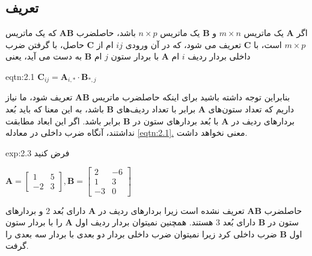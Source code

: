 \subsection{\textbf{تعریف}}
\label{subsec:2.2.1}
{
    \Large
    \begin{spacing}{1.5}
        اگر $\textbf{A}$ یک ماتریس $m\times n$ و $\textbf{B}$ یک ماتریس $n\times p$ باشد،
        حاصلضرب $\textbf{AB}$ که یک ماتریس $m\times p$ است، با $\textbf{C}$ تعریف می شود،
        که در آن ورودی $ij$ ام از $\textbf{C}$ حاصل، با گرفتن ضرب داخلی بردار ردیف $i$ ام $\textbf{A}$ با بردار ستون $j$ ام $\textbf{B}$ به دست می آید، یعنی

        \begin{eqtn}{eqtn:2.1}
            \centering
            $\textbf{C}_{ij}=\textbf{A}_{i,*}\cdot\textbf{B}_{*,j}$
        \end{eqtn}

        بنابراین توجه داشته باشید برای اینکه حاصلضرب ماتریس $\textbf{AB}$ تعریف شود، ما نیاز داریم که تعداد ستون‌های $\textbf{A}$ برابر با تعداد ردیف‌های $\textbf{B}$ باشد،
        به این معنا که باید بُعد بردارهای ردیف در $\textbf{A}$ با بُعد بردارهای ستون در $\textbf{B}$ برابر باشد.
        اگر این ابعاد مطابقت نداشتند، آنگاه ضرب داخلی در معادله \hyperref[eqtn:2.1]{\ref{eqtn:2.1}.} معنی نخواهد داشت.

        \begin{example}{exp:2.3}
            \Large
            فرض کنید

            \begin{center}
                $\textbf{A}=\begin{bmatrix}
                                1  & 5 \\
                                -2 & 3
                \end{bmatrix}, \textbf{B}=\begin{bmatrix}
                                              2  & -6 \\
                                              1  & 3  \\
                                              -3 & 0
                \end{bmatrix}$
            \end{center}

            حاصلضرب $\textbf{AB}$ تعریف نشده است زیرا بردارهای ردیف در $\textbf{A}$ دارای بُعد $2$ و بردارهای ستون در $\textbf{B}$ دارای بُعد $3$ هستند.
            همچنین نمیتوان بردار ردیف اول $\textbf{A}$ را با بردار ستون اول $\textbf{B}$  ضرب داخلی کرد زیرا نمیتوان ضرب داخلی بردار دو بعدی با بردار سه بعدی را گرفت.
        \end{example}


\end{spacing}}
